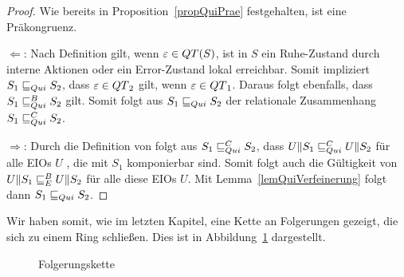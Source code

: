 \begin{proof}
  Wie bereits in Proposition~\ref{propQuiPrae} festgehalten, ist \QRel{} eine
  Präkongruenz.

  \glqq{}$\Leftarrow$\grqq{}: Nach Definition gilt, wenn
  $\varepsilon\in QT{}(S)$, ist in $S$ ein Ruhe-Zustand durch interne Aktionen
  oder ein Error-Zustand lokal erreichbar. Somit impliziert $S_1\sqsubseteq _{Qui} S_2$,
  dass $\varepsilon\in QT{}_2$ gilt, wenn $\varepsilon\in QT{}_1$. Daraus folgt
  ebenfalls, dass $S_1\sqsubseteq _{Qui}^B S_2$ gilt. Somit folgt aus $S_1\sqsubseteq _{Qui} S_2$ der
  relationale Zusammenhang $S_1\sqsubseteq _{Qui}^C S_2$.

  \glqq{}$\Rightarrow$\grqq{}: Durch die Definition von \QCRel{} folgt aus
  $S_1\sqsubseteq _{Qui}^C{} S_2$, dass $U\|S_1\sqsubseteq _{Qui}^C U\|S_2$ für alle EIOs $U$ , die mit
  $S_1$ komponierbar sind. Somit folgt auch die Gültigkeit von $U\|S_1\sqsubseteq _E^B
  U\|S_2$ für alle diese EIOs $U$. Mit Lemma~\ref{lemQuiVerfeinerung} folgt
  dann $S_1\sqsubseteq _{Qui}{} S_2$.
\end{proof}

Wir haben somit, wie im letzten Kapitel, eine Kette an Folgerungen gezeigt, die
sich zu einem Ring schließen. Dies ist in Abbildung~\ref{FolgerungsketteQui}
dargestellt.

\begin{figure}[h!tbp]
  \begin{center}
    \caption{Folgerungskette}
    \label{FolgerungsketteQui}
  \end{center}
\end{figure}

